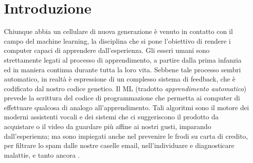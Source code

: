 \chapter{Introduzione}\label{ch:introduzione}





Chiunque abbia un cellulare di nuova generazione è venuto in contatto con il 
campo del machine learning, la disciplina che si pone l'obiettivo di rendere 
i computer capaci di apprendere dall'esperienza. 
Gli esseri umani sono strettamente legati al processo di apprendimento, a 
partire dalla prima infanzia ed in maniera continua durante tutta la loro vita. 
Sebbene tale processo sembri automatico, in realtà è espressione di un 
complesso sistema di feedback, che è codificato dal nostro codice genetico. 
Il \ac{ML} (tradotto \emph{apprendimento automatico}) prevede la scrittura 
del codice di programmazione che permetta 
ai computer di effettuare qualcosa di analogo all'apprendimento. 
Tali algoritmi sono il motore dei moderni assistenti vocali e dei sistemi 
che ci suggeriscono il prodotto da acquistare o il video da guardare più affine ai nostri gusti, 
imparando dall'esperienza; ma sono impiegati anche 
nel prevenire le frodi su carta di credito, per filtrare lo spam dalle nostre caselle 
email, nell'individuare e diagnosticare malattie, e tanto ancora \cite{pml}. 


